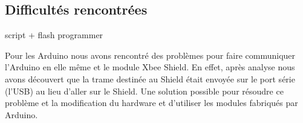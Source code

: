 
\subsection{Difficultés rencontrées}







script + flash programmer


Pour les Arduino nous avons rencontré des problèmes pour faire communiquer l'Arduino en elle même et le module Xbee Shield. 
En effet, après analyse nous avons découvert que la trame destinée au Shield était envoyée sur le port série (l'USB) au lieu d'aller sur le Shield.
Une solution possible pour résoudre ce problème et la modification du hardware et d'utiliser les modules fabriqués par Arduino.




